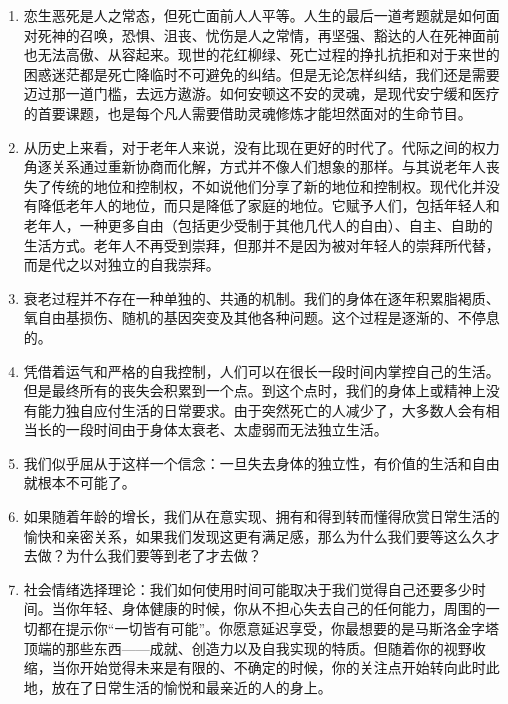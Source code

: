 \documentclass[UTF8]{ctexart}
\begin{document}
		\begin{enumerate}
			
			\item 恋生恶死是人之常态，但死亡面前人人平等。人生的最后一道考题就是如何面对死神的召唤，恐惧、沮丧、忧伤是人之常情，再坚强、豁达的人在死神面前也无法高傲、从容起来。现世的花红柳绿、死亡过程的挣扎抗拒和对于来世的困惑迷茫都是死亡降临时不可避免的纠结。但是无论怎样纠结，我们还是需要迈过那一道门槛，去远方遨游。如何安顿这不安的灵魂，是现代安宁缓和医疗的首要课题，也是每个凡人需要借助灵魂修炼才能坦然面对的生命节目。
			
			\item 从历史上来看，对于老年人来说，没有比现在更好的时代了。代际之间的权力角逐关系通过重新协商而化解，方式并不像人们想象的那样。与其说老年人丧失了传统的地位和控制权，不如说他们分享了新的地位和控制权。现代化并没有降低老年人的地位，而只是降低了家庭的地位。它赋予人们，包括年轻人和老年人，一种更多自由（包括更少受制于其他几代人的自由）、自主、自助的生活方式。老年人不再受到崇拜，但那并不是因为被对年轻人的崇拜所代替，而是代之以对独立的自我崇拜。
			
			\item 衰老过程并不存在一种单独的、共通的机制。我们的身体在逐年积累脂褐质、氧自由基损伤、随机的基因突变及其他各种问题。这个过程是逐渐的、不停息的。
			
			\item 凭借着运气和严格的自我控制，人们可以在很长一段时间内掌控自己的生活。但是最终所有的丧失会积累到一个点。到这个点时，我们的身体上或精神上没有能力独自应付生活的日常要求。由于突然死亡的人减少了，大多数人会有相当长的一段时间由于身体太衰老、太虚弱而无法独立生活。
			
			\item 我们似乎屈从于这样一个信念：一旦失去身体的独立性，有价值的生活和自由就根本不可能了。
			
			\item 如果随着年龄的增长，我们从在意实现、拥有和得到转而懂得欣赏日常生活的愉快和亲密关系，如果我们发现这更有满足感，那么为什么我们要等这么久才去做？为什么我们要等到老了才去做？
			
			\item 社会情绪选择理论：我们如何使用时间可能取决于我们觉得自己还要多少时间。当你年轻、身体健康的时候，你从不担心失去自己的任何能力，周围的一切都在提示你“一切皆有可能”。你愿意延迟享受，你最想要的是马斯洛金字塔顶端的那些东西——成就、创造力以及自我实现的特质。但随着你的视野收缩，当你开始觉得未来是有限的、不确定的时候，你的关注点开始转向此时此地，放在了日常生活的愉悦和最亲近的人的身上。
			

\end{enumerate}
\end{document}
